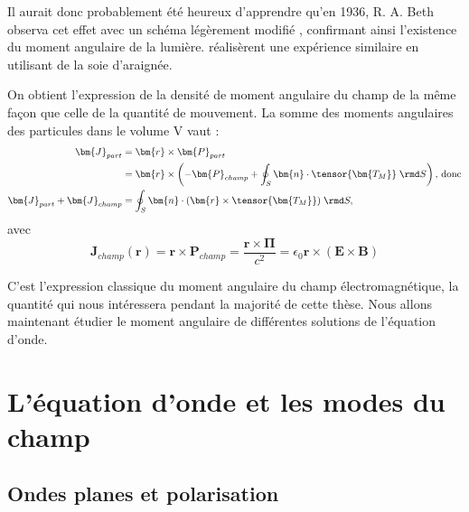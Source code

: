 Il aurait donc probablement été heureux d'apprendre qu'en 1936, R. A. Beth observa cet effet avec un schéma légèrement modifié , confirmant ainsi l'existence du moment angulaire de la lumière.  réalisèrent une expérience similaire en utilisant de la soie d'araignée.\par
On obtient l'expression de la densité de moment angulaire du champ de la même façon que celle de la quantité de mouvement. La somme des moments angulaires des particules dans le volume V vaut :
\begin{align*}
\bm{J}_{part} &= \bm{r}\times\bm{P}_{part} \\
&= \bm{r}\times\left(-\bm{P}_{champ} + \oint_S \bm{n}\cdot\tensor{\bm{T_M}}\;\rmd S\right)\text{, donc} \\
\bm{J}_{part}+\bm{J}_{champ} &= \oint_S \bm{n}\cdot(\bm{r}\times\tensor{\bm{T_M}})\;\rmd S,
\end{align*}
avec
\begin{equation}
\bm{J}_{champ}(\bm{r})=\bm{r}\times{\bm{P}_{champ}}=\frac{\bm{r}\times\bm{\Pi}}{c^2} = \epsilon_0\bm{r}\times(\bm{E}\times\bm{B})
\label{Eq.DefJEM}
\end{equation}

C'est l'expression classique du moment angulaire du champ électromagnétique, la quantité qui nous intéressera pendant la majorité de cette thèse. Nous allons maintenant étudier le moment angulaire de différentes solutions de l'équation d'onde.

\chapter{L'équation d'onde et les modes du champ}
\label{ch:modes}
\section{Ondes planes et polarisation}
